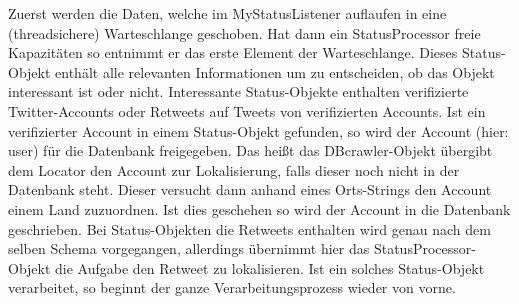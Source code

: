 Zuerst werden die Daten, welche im MyStatusListener auflaufen in eine (threadsichere) Warteschlange geschoben.
Hat dann ein StatusProcessor freie Kapazitäten so entnimmt er das erste Element der Warteschlange. Dieses Status-Objekt enthält alle relevanten Informationen um zu entscheiden, ob das Objekt interessant ist oder nicht.
Interessante Status-Objekte enthalten verifizierte Twitter-Accounts oder Retweets auf Tweets von verifizierten Accounts. Ist ein verifizierter Account in einem Status-Objekt gefunden, so wird der Account (hier: user) für die Datenbank freigegeben. Das heißt das DBcrawler-Objekt übergibt
dem Locator den Account zur Lokalisierung, falls dieser noch nicht in der Datenbank steht. Dieser versucht dann anhand eines Orts-Strings den Account einem Land zuzuordnen. Ist dies geschehen so wird der Account in die Datenbank geschrieben. 
Bei Status-Objekten die Retweets enthalten wird genau nach dem selben Schema vorgegangen, allerdings übernimmt hier das StatusProcessor-Objekt die Aufgabe den Retweet zu lokalisieren.
Ist ein solches Status-Objekt verarbeitet, so beginnt der ganze Verarbeitungsprozess wieder von vorne.
